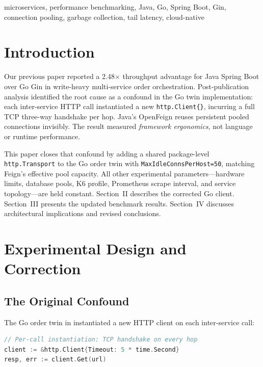 \documentclass[conference]{IEEEtran}
\begin{document}
\begin{IEEEkeywords}
microservices, performance benchmarking, Java, Go, Spring Boot, Gin, connection pooling, garbage collection, tail latency, cloud-native
\end{IEEEkeywords}

\section{Introduction}

Our previous paper \cite{b10} reported a 2.48$\times$ throughput advantage for Java Spring Boot over Go Gin in write-heavy multi-service order orchestration. Post-publication analysis identified the root cause as a confound in the Go twin implementation: each inter-service HTTP call instantiated a new \texttt{http.Client\{\}}, incurring a full TCP three-way handshake per hop. Java's OpenFeign reuses persistent pooled connections invisibly. The result measured \textit{framework ergonomics}, not language or runtime performance.

This paper closes that confound by adding a shared package-level \texttt{http.Transport} to the Go order twin with \texttt{MaxIdleConnsPerHost=50}, matching Feign's effective pool capacity. All other experimental parameters---hardware limits, database pools, K6 profile, Prometheus scrape interval, and service topology---are held constant. Section~II describes the corrected Go client. Section~III presents the updated benchmark results. Section~IV discusses architectural implications and revised conclusions.

\section{Experimental Design and Correction}

\subsection{The Original Confound}

The Go order twin in \cite{b10} instantiated a new HTTP client on each inter-service call:

\begin{lstlisting}[language=Go, caption={Original Go client---no connection reuse (FIXED)}, label={lst:goold}]
// Per-call instantiation: TCP handshake on every hop
client := &http.Client{Timeout: 5 * time.Second}
resp, err := client.Get(url)
\end{lstlisting}
\end{document}
